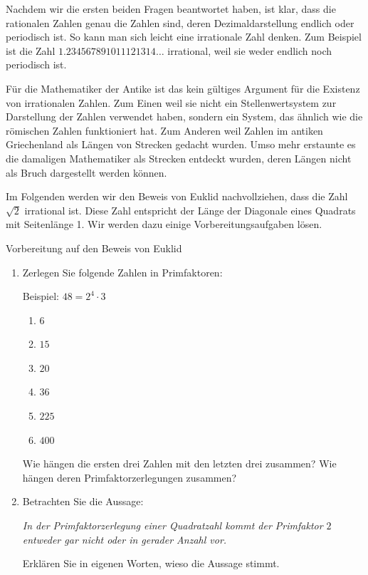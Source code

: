 \clearpage

Nachdem wir die ersten beiden Fragen beantwortet haben, ist klar, dass die rationalen Zahlen genau die Zahlen sind, deren Dezimaldarstellung endlich oder periodisch ist. So kann man sich leicht eine irrationale Zahl denken. Zum Beispiel ist die Zahl \(1.234567891011121314\ldots\) irrational, weil sie weder endlich noch periodisch ist.

Für die Mathematiker der Antike ist das kein gültiges Argument für die Existenz von irrationalen Zahlen. Zum Einen weil sie nicht ein Stellenwertsystem zur Darstellung der Zahlen verwendet haben, sondern ein System, das ähnlich wie die römischen Zahlen funktioniert hat. Zum Anderen weil Zahlen im antiken Griechenland als Längen von Strecken gedacht wurden. Umso mehr erstaunte es die damaligen Mathematiker als Strecken entdeckt wurden, deren Längen nicht als Bruch dargestellt werden können.

Im Folgenden werden wir den Beweis von Euklid nachvollziehen, dass die Zahl \(\sqrt{2}\) irrational ist. Diese Zahl entspricht der Länge der Diagonale eines Quadrats mit Seitenlänge 1. Wir werden dazu einige Vorbereitungsaufgaben lösen.


\begin{LA}
    {Vorbereitung auf den Beweis von Euklid}{}
    \begin{enumerate}
        \item Zerlegen Sie folgende Zahlen in Primfaktoren:

              Beispiel: \(48 = 2^4 \cdot 3\)

              \begin{enumerate}
                  \item \(6\)
                  \item \(15\)
                  \item \(20\)
                  \item \(36\)
                  \item  \(225\)
                  \item \(400\)
              \end{enumerate}

              Wie hängen die ersten drei Zahlen mit den letzten drei zusammen? Wie hängen deren Primfaktorzerlegungen zusammen?

        \item Betrachten Sie die Aussage:

              \textit{In der Primfaktorzerlegung einer Quadratzahl kommt der Primfaktor \(2\) entweder gar nicht oder in gerader Anzahl vor.}

              Erklären Sie in eigenen Worten, wieso die Aussage stimmt.
    \end{enumerate}
\end{LA}

